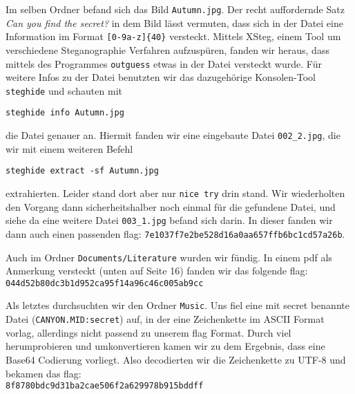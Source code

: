\documentclass[10pt,a4paper]{article}
\begin{document}
Im selben Ordner befand sich das Bild \texttt{Autumn.jpg}. Der recht auffordernde Satz \textit{Can you find the secret?} in dem Bild lässt vermuten, dass sich in der Datei eine Information im Format \texttt{[0-9a-z]\{40\}} versteckt. Mittels XSteg, einem Tool um verschiedene Steganographie Verfahren aufzuspüren, fanden wir heraus, dass mittels des Programmes \texttt{outguess} etwas in der Datei versteckt wurde. Für weitere Infos zu der Datei benutzten wir das dazugehörige Konsolen-Tool \texttt{steghide} und schauten mit
\begin{verbatim}
steghide info Autumn.jpg
\end{verbatim}
die Datei genauer an. Hiermit fanden wir eine eingebaute Datei \texttt{002\_2.jpg}, die wir mit einem weiteren Befehl
\begin{verbatim}
steghide extract -sf Autumn.jpg
\end{verbatim}
extrahierten. Leider stand dort aber nur \texttt{nice try} drin stand. Wir wiederholten den Vorgang dann sicherheitshalber noch einmal für die gefundene Datei, und siehe da eine weitere Datei \texttt{003\_1.jpg} befand sich darin. In dieser fanden wir dann auch einen passenden flag: \texttt{7e1037f7e2be528d16a0aa657ffb6bc1cd57a26b}.

Auch im Ordner \texttt{Documents/Literature} wurden wir fündig. In einem pdf als Anmerkung versteckt (unten auf Seite 16) fanden wir das folgende flag:
\texttt{044d52b80dc3b1d952ca95f14a96c46c005ab9cc}

Als letztes durchsuchten wir den Ordner \texttt{Music}. Uns fiel eine mit secret benannte Datei (\texttt{CANYON.MID:secret}) auf, in der eine Zeichenkette im ASCII Format vorlag, allerdings nicht passend zu unserem flag Format. Durch viel herumprobieren und umkonvertieren kamen wir zu dem Ergebnis, dass eine Base64 Codierung vorliegt. Also decodierten wir die Zeichenkette zu UTF-8 und bekamen das flag:\\
\texttt{8f8780bdc9d31ba2cae506f2a629978b915bddff}
\end{document}
